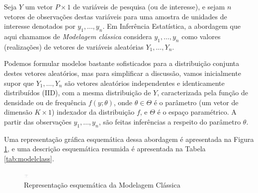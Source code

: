 \documentclass[
  12pt,
  brazilian,
]{book}
\theoremstyle{definition}
\theoremstyle{definition}
\theoremstyle{definition}
\theoremstyle{definition}
\theoremstyle{remark}
\begin{document}
Seja \(Y\) um vetor \(P \times 1\) de variáveis de pesquisa (ou de interesse), e
sejam \(n\) vetores de observações destas variáveis para uma amostra de unidades
de interesse denotados por \(y_1, \ldots ,y_n\). Em Inferência Estatística, a
abordagem que aqui chamamos de \emph{Modelagem clássica} considera \(y_1, \ldots ,y_n\)
como valores (realizações) de vetores de variáveis aleatórias
\(Y_1, \ldots ,Y_n\).

Podemos formular modelos bastante sofisticados para a distribuição conjunta
destes vetores aleatórios, mas para simplificar a discussão, vamos inicialmente
supor que \(Y_1, \ldots ,Y_n\) são vetores aleatórios independentes e
identicamente distribuídos (IID), com a mesma distribuição de \(Y\), caracterizada
pela função de densidade ou de frequência \(f(y;\theta)\), onde
\(\theta \in \Theta\) é o parâmetro (um vetor de dimensão \(K \times 1\)) indexador
da distribuição \(f\), e \(\Theta\) é o espaço paramétrico. A partir das observações
\(y_1, \ldots ,y_n\), são feitas inferências a respeito do parâmetro \(\theta\).

Uma representação gráfica esquemática dessa abordagem é apresentada na Figura
\ref{fig:modclas}, e uma descrição esquemática resumida é apresentada na Tabela
\ref{tab:modelclass}.

\begin{figure}
\includegraphics[width=10,6in]{Figuras/Figura2.1} \caption{Representação esquemática da Modelagem Clássica}\label{fig:modclas}
\end{figure}
\end{document}
